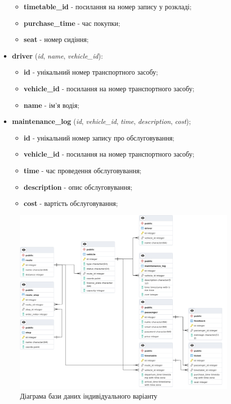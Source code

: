 \documentclass[14pt]{extreport}
\begin{document}
\begin{normalsize}
\begin{itemize}
\begin{itemize}
			\item \textbf{timetable\_id} - посилання на номер запису у розкладі;
			\item \textbf{purchase\_time} - час покупки;
			\item \textbf{seat} - номер сидіння;
		\end{itemize}
		\item \textbf{driver} (\textit{id}, \textit{name}, \textit{vehicle\_id}):
		\begin{itemize}
			\item \textbf{id} - унікальний номер транспортного засобу;
			\item \textbf{vehicle\_id} - посилання на номер транспортного засобу;
			\item \textbf{name} - ім'я водія;
		\end{itemize}
		\item \textbf{maintenance\_log} (\textit{id}, \textit{vehicle\_id}, \textit{time}, \textit{description}, \textit{cost});
		\begin{itemize}
			\item \textbf{id} - унікальний номер запису про обслуговування;
			\item \textbf{vehicle\_id} - посилання на номер транспортного засобу;
			\item \textbf{time} - час проведення обслуговування;
			\item \textbf{description} - опис обслуговування;
			\item \textbf{cost} - вартість обслуговування;
		\end{itemize}
	\end{itemize}
	
	
	\begin{figure}[H]
		\centering
		\includegraphics[scale=0.4]{50}
		\caption{Діаграма бази даних індивідуального варіанту}
	\end{figure}
	

\end{normalsize}
\end{document}
